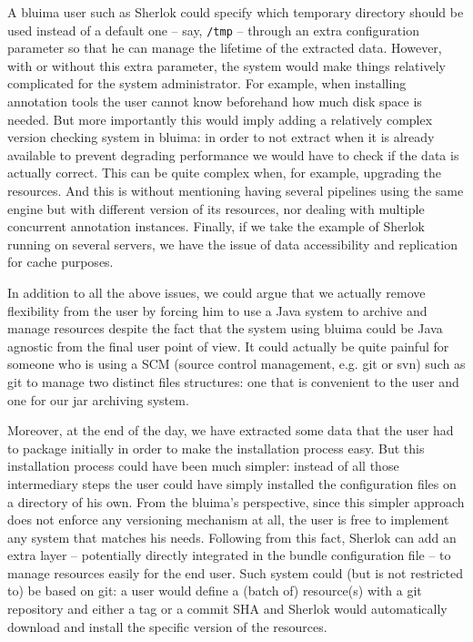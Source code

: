 \documentclass{article}
\newcommand{\path}[1]{\mbox{\texttt{#1}}}
\begin{document}
A bluima user such as Sherlok could specify which temporary directory should be used instead of a default one -- say, \path{/tmp} -- through an extra configuration parameter so that he can manage the lifetime of the extracted data. However, with or without this extra parameter, the system would make things relatively complicated for the system administrator. For example, when installing annotation tools the user cannot know beforehand how much disk space is needed. But more importantly this would imply adding a relatively complex version checking system in bluima: in order to not extract when it is already available to prevent degrading performance we would have to check if the data is actually correct. This can be quite complex when, for example, upgrading the resources. And this is without mentioning having several pipelines using the same engine but with different version of its resources, nor dealing with multiple concurrent annotation instances. Finally, if we take the example of Sherlok running on several servers, we have the issue of data accessibility and replication for cache purposes.

In addition to all the above issues, we could argue that we actually remove flexibility from the user by forcing him to use a Java system to archive and manage resources despite the fact that the system using bluima could be Java agnostic from the final user point of view. It could actually be quite painful for someone who is using a SCM (source control management, e.g. git or svn) such as git to manage two distinct files structures: one that is convenient to the user and one for our jar archiving system.

Moreover, at the end of the day, we have extracted some data that the user had to package initially in order to make the installation process easy. But this installation process could have been much simpler: instead of all those intermediary steps the user could have simply installed the configuration files on a directory of his own. From the bluima's perspective, since this simpler approach does not enforce any versioning mechanism at all, the user is free to implement any system that matches his needs. Following from this fact, Sherlok can add an extra layer -- potentially directly integrated in the bundle configuration file -- to manage resources easily for the end user. Such system could (but is not restricted to) be based on git: a user would define a (batch of) resource(s) with a git repository and either a tag or a commit SHA and Sherlok would automatically download and install the specific version of the resources.
\end{document}
